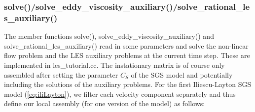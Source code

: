 \documentclass[a4paper, 11pt, twoside]{article}
\begin{document}
\subsubsection{solve()/solve\_eddy\_viscosity\_auxiliary()/solve\_rational\_les\_auxiliary()}

The member functions solve(), solve\_eddy\_viscosity\_auxiliary() and solve\_rational\_les\_auxiliary() read in some parameters and solve the non-linear flow problem and the LES auxiliary problems at the current time step. These are implemented in les\_tutorial.cc. The instationary matrix is of course only assembled after setting the parameter $C_S$ of the SGS model and potentially including the solutions of the auxiliary problems. For the first Iliescu-Layton SGS model (\ref{eq:iliLayton}), we filter each velocity component separately and thus define our local assembly (for one version of the model) as follows:   
\end{document}
